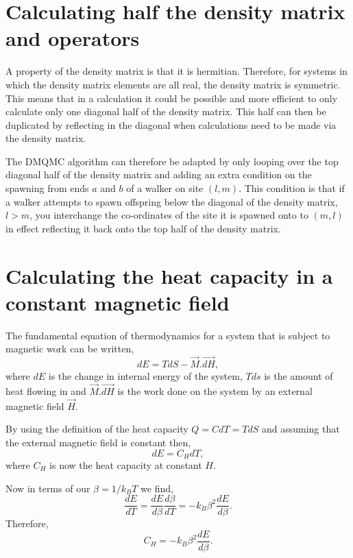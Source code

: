 \documentclass[12pt,a4paper]{article}
\begin{document}
\section{Calculating half the density matrix and operators}
A property of the density matrix is that it is hermitian. Therefore, for systems in which the density matrix elements are all real, the density matrix is symmetric. This means that in a calculation it could be possible and more efficient to only calculate only one diagonal half of the density matrix. This half can then be duplicated by reflecting in the diagonal when calculations need to be made via the density matrix.

The DMQMC algorithm can therefore be adapted by only looping over the top diagonal half of the density matrix and adding an extra condition on the spawning from ends $a$ and $b$ of a walker on site $(l,m)$. This condition is that if a walker attempts to spawn offspring below the diagonal of the density matrix, $l>m$, you interchange the co-ordinates of the site it is spawned onto to $(m,l)$ in effect reflecting it back onto the top half of the density matrix.

\section{Calculating the heat capacity in a constant magnetic field}
The fundamental equation of thermodynamics for a system that is subject to magnetic work can be written,
\begin{equation}
dE = TdS-\vec{M}.\vec{dH},
\end{equation}
where $dE$ is the change in internal energy of the system, $Tds$ is the amount of heat flowing in and $\vec{M}.\vec{dH}$ is the work done on the system by an external magnetic field $\vec{H}$.

By using the definition of the heat capacity $Q=CdT=TdS$ and assuming that the external magnetic field is constant then,
\begin{equation}
dE = C_{H}dT,	
\end{equation}
where $C_{H}$ is now the heat capacity at constant $H$.

Now in terms of our $\beta = 1/k_{B}T$ we find,
\begin{equation}
\frac{dE}{dT} = \frac{dE}{d\beta}\frac{d\beta}{dT} = -k_{B}\beta^2\frac{dE}{d\beta}.
\end{equation}
Therefore,
\begin{equation}
C_{H} = -k_{B}\beta^2\frac{dE}{d\beta}.
\end{equation}
\end{document}
